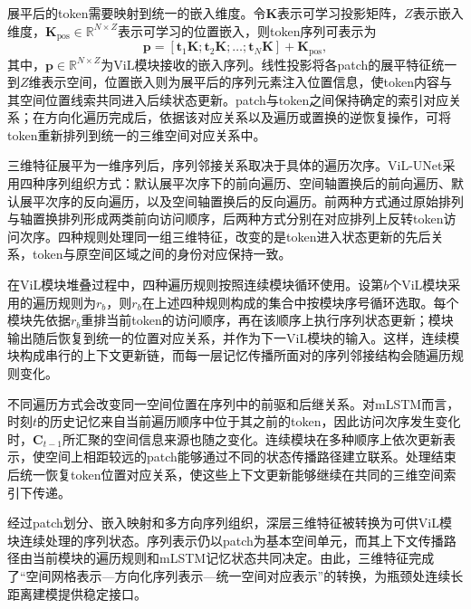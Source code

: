 展平后的token需要映射到统一的嵌入维度。令\(\mathbf K\)表示可学习投影矩阵，\(Z\)表示嵌入维度，\(\mathbf K_{\mathrm{pos}}\in\mathbb R^{N\times Z}\)表示可学习的位置嵌入，则token序列可表示为
\begin{equation}
\label{eq:ch3-vil-token-embedding}
\mathbf p=
[\mathbf t_1\mathbf K;\mathbf t_2\mathbf K;\ldots;\mathbf t_N\mathbf K]
+\mathbf K_{\mathrm{pos}},
\end{equation}
其中，\(\mathbf p\in\mathbb R^{N\times Z}\)为ViL模块接收的嵌入序列。线性投影将各patch的展平特征统一到\(Z\)维表示空间，位置嵌入则为展平后的序列元素注入位置信息，使token内容与其空间位置线索共同进入后续状态更新。patch与token之间保持确定的索引对应关系；在方向化遍历完成后，依据该对应关系以及遍历或置换的逆恢复操作，可将token重新排列到统一的三维空间对应关系中。

三维特征展平为一维序列后，序列邻接关系取决于具体的遍历次序。ViL-UNet采用四种序列组织方式：默认展平次序下的前向遍历、空间轴置换后的前向遍历、默认展平次序的反向遍历，以及空间轴置换后的反向遍历。前两种方式通过原始排列与轴置换排列形成两类前向访问顺序，后两种方式分别在对应排列上反转token访问次序。四种规则处理同一组三维特征，改变的是token进入状态更新的先后关系，token与原空间区域之间的身份对应保持一致。

在ViL模块堆叠过程中，四种遍历规则按照连续模块循环使用。设第\(b\)个ViL模块采用的遍历规则为\(r_b\)，则\(r_b\)在上述四种规则构成的集合中按模块序号循环选取。每个模块先依据\(r_b\)重排当前token的访问顺序，再在该顺序上执行序列状态更新；模块输出随后恢复到统一的位置对应关系，并作为下一ViL模块的输入。这样，连续模块构成串行的上下文更新链，而每一层记忆传播所面对的序列邻接结构会随遍历规则变化。

不同遍历方式会改变同一空间位置在序列中的前驱和后继关系。对mLSTM而言，时刻\(t\)的历史记忆来自当前遍历顺序中位于其之前的token，因此访问次序发生变化时，\(\mathbf C_{t-1}\)所汇聚的空间信息来源也随之变化。连续模块在多种顺序上依次更新表示，使空间上相距较远的patch能够通过不同的状态传播路径建立联系。处理结束后统一恢复token位置对应关系，使这些上下文更新能够继续在共同的三维空间索引下传递。


经过patch划分、嵌入映射和多方向序列组织，深层三维特征被转换为可供ViL模块连续处理的序列状态。序列表示仍以patch为基本空间单元，而其上下文传播路径由当前模块的遍历规则和mLSTM记忆状态共同决定。由此，三维特征完成了“空间网格表示—方向化序列表示—统一空间对应表示”的转换，为瓶颈处连续长距离建模提供稳定接口。

